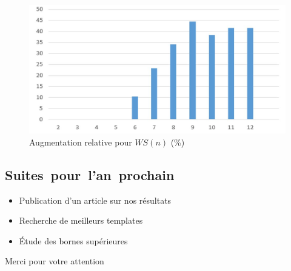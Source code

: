 \documentclass[graphics]{beamer}
\begin{document}
\begin{frame}
	\begin{figure}
	        \includegraphics[scale=0.4]{augmentation.png}
	        \caption{Augmentation relative pour \(WS(n)\) (\%)}
	\end{figure}
\end{frame}

\subsection{Suites~pour~l'an~prochain}
\begin{frame}
	\begin{itemize}
		\setlength\itemsep{2.5ex}
		\item Publication d'un article sur nos résultats
		\item Recherche de meilleurs templates
		\item Étude des bornes supérieures
	\end{itemize}
\end{frame}


\begin{frame}
	\begin{center}
		\Huge Merci pour votre attention
	\end{center}
\end{frame}
\end{document}
